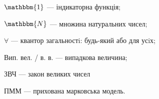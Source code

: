 $\mathbbm{1}$ --- індикаторна функція;

$\mathbbm{N}$ --- множина натуральних чисел;

$\forall$ --- квантор загальностi: будь-який або для усiх;

Вип. вел. / в. в. --- випадкова величина;

ЗВЧ --- закон великих чисел

ПММ --- прихована марковська модель.